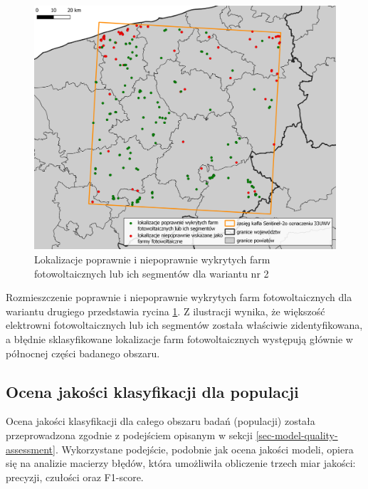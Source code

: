 \documentclass{amuthesis}
\begin{document}
\begin{figure}[t]

{\centering \includegraphics[width=1\textwidth,height=\textheight]{figures/poprawne_niepoprawne_wskazania_dataset2.png}

}

\caption{\label{fig-rycina-classification-results-dataset2}Lokalizacje
poprawnie i niepoprawnie wykrytych farm fotowoltaicznych lub ich
segmentów dla wariantu nr 2}

\end{figure}

Rozmieszczenie poprawnie i niepoprawnie wykrytych farm fotowoltaicznych
dla wariantu drugiego przedstawia rycina
\ref{fig-rycina-classification-results-dataset2}. Z ilustracji wynika,
że większość elektrowni fotowoltaicznych lub ich segmentów została
właściwie zidentyfikowana, a błędnie sklasyfikowane lokalizacje farm
fotowoltaicznych występują głównie w północnej części badanego obszaru.

\hypertarget{sec-population-quality-assessment}{%
\subsection{Ocena jakości klasyfikacji dla
populacji}\label{sec-population-quality-assessment}}

Ocena jakości klasyfikacji dla całego obszaru badań (populacji) została
przeprowadzona zgodnie z podejściem opisanym w sekcji
\ref{sec-model-quality-assessment}. Wykorzystane podejście, podobnie jak
ocena jakości modeli, opiera się na analizie macierzy błędów, która
umożliwiła obliczenie trzech miar jakości: precyzji, czułości oraz
F1-score.
\end{document}
